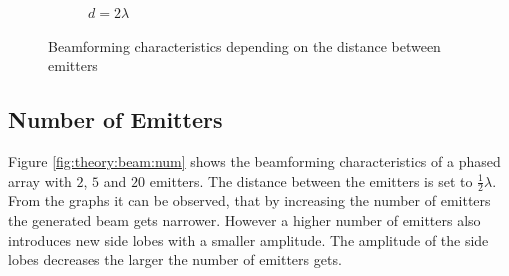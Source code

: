\begin{figure}[ht]
\begin{subfigure}[b]{0.32\textwidth}
    \caption{$d = 2\lambda$}
    \label{fig:theory:beam:d2}
  \end{subfigure}
  \caption{Beamforming characteristics depending on the distance between emitters}
  \label{fig:theory:beam:d}
\end{figure}
%
\subsection{Number of Emitters}

Figure \ref{fig:theory:beam:num} shows the beamforming characteristics of a phased array with $2$, $5$ and $20$ emitters. The distance between the emitters is set to $\frac{1}{2} \lambda$. From the graphs it can be observed, that by increasing the number of emitters the generated beam gets narrower. However a higher number of emitters also introduces new side lobes with a smaller amplitude. The amplitude of the side lobes decreases the larger the number of emitters gets.
%
